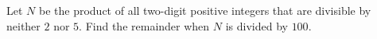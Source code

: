 Let $N$ be the product of all two-digit positive integers that are divisible by neither $2$ nor $5$. Find the remainder when $N$ is divided by $100$.
